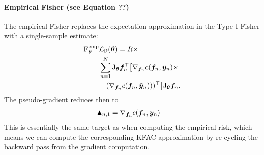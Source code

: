 \paragraph{Empirical Fisher (see Equation ??)}
The empirical Fisher replaces the expectation approximation in the Type-I Fisher with a single-sample estimate:
\begin{align*}
  \mathrm{F}_{\bm{\theta}}^{\text{emp}} &{\mathcal{L}}_{{\mathbb{D}}}({\bm{\theta}}) = R \times \\
    &\sum_{n=1}^N
      \mathrm{J}_{{\bm{\theta}}} {\bm{f}}_n^{\top}
      \big[
      \nabla_{{\bm{f}}_n} c({\bm{f}}_n, \tilde{{\bm{y}}}_{n}) \times \\
    &\quad(\nabla_{{\bm{f}}_n} c({\bm{f}}_n, \tilde{{\bm{y}}}_{n})))^{\top}
    \big]
    \mathrm{J}_{{\bm{\theta}}} {\bm{f}}_n.
\end{align*}
The pseudo-gradient reduces then to
\begin{align*}
  \blacktriangle_{n,1}
  &= \nabla_{{\bm{f}}_n}  c({\bm{f}}_n, {\bm{y}}_n)
\end{align*}
This is essentially the same target as when computing the empirical risk, which means we can compute the corresponding KFAC approximation by re-cycling the backward pass from the gradient computation.


